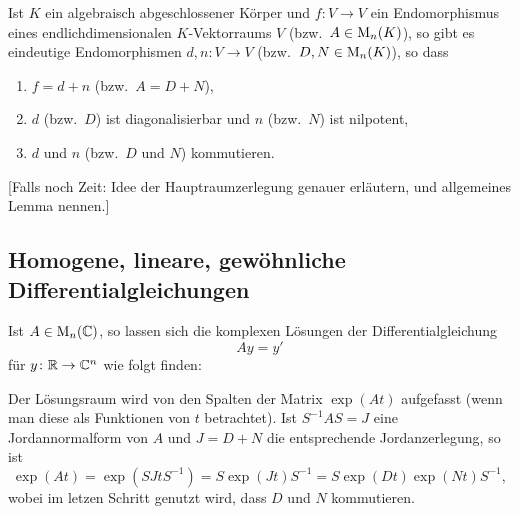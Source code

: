 \begin{corollary}
  Ist $K$ ein algebraisch abgeschlossener Körper und $f \colon V \to V$ ein Endomorphismus eines endlichdimensionalen $K$-Vektorraums $V$ (bzw.\ $A \in \mathrm{M}_n(K)$), so gibt es eindeutige Endomorphismen $d, n \colon V \to V$ (bzw.\ $D, N \in \mathrm{M}_n(K)$), so dass
  \begin{enumerate}[leftmargin=*, label=\alph*)]
    \item
      $f = d + n$ (bzw.\ $A = D + N$),
    \item
      $d$ (bzw.\ $D$) ist diagonalisierbar und $n$ (bzw.\ $N$) ist nilpotent,
    \item
      $d$ und $n$ (bzw.\ $D$ und $N$) kommutieren.
  \end{enumerate}
\end{corollary}


[Falls noch Zeit: Idee der Hauptraumzerlegung genauer erläutern, und allgemeines Lemma nennen.]










\subsection{Homogene, lineare, gewöhnliche Differentialgleichungen}


Ist $A \in \mathrm{M}_n(\mathbb{C})$, so lassen sich die komplexen Lösungen der Differentialgleichung
\[
  A y = y'
\]
für $y \colon \mathbb{R} \to \mathbb{C}^n$ wie folgt finden:

Der Lösungsraum wird von den Spalten der Matrix $\exp(At)$ aufgefasst (wenn man diese als Funktionen von $t$ betrachtet).
Ist $S^{-1} A S = J$ eine Jordannormalform von $A$ und $J = D + N$ die entsprechende Jordanzerlegung, so ist
\[
    \exp(At)
  = \exp(S Jt S^{-1})
  = S \exp(Jt) S^{-1}
  = S \exp(Dt) \exp(Nt) S^{-1},
\]
wobei im letzen Schritt genutzt wird, dass $D$ und $N$ kommutieren.











